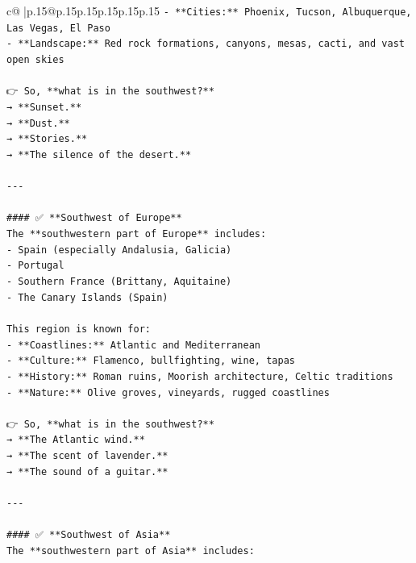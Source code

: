 \documentclass{article}
\begin{document}
{\begin{supertabular}{c@{$\;$}|p{.15\linewidth}@{}p{.15\linewidth}p{.15\linewidth}p{.15\linewidth}p{.15\linewidth}p{.15\linewidth}}
{{{\texttt{{-} **Cities:** Phoenix, Tucson, Albuquerque, Las Vegas, El Paso} \\
\texttt{{-} **Landscape:** Red rock formations, canyons, mesas, cacti, and vast open skies} \\
\\ 
\texttt{👉 So, **what is in the southwest?**  } \\
\texttt{→ **Sunset.**  } \\
\texttt{→ **Dust.**  } \\
\texttt{→ **Stories.**  } \\
\texttt{→ **The silence of the desert.**} \\
\\ 
\texttt{{-}{-}{-}} \\
\\ 
\texttt{\#\#\#\# ✅ **Southwest of Europe**  } \\
\texttt{The **southwestern part of Europe** includes:} \\
\texttt{{-} Spain (especially Andalusia, Galicia)} \\
\texttt{{-} Portugal} \\
\texttt{{-} Southern France (Brittany, Aquitaine)} \\
\texttt{{-} The Canary Islands (Spain)} \\
\\ 
\texttt{This region is known for:} \\
\texttt{{-} **Coastlines:** Atlantic and Mediterranean} \\
\texttt{{-} **Culture:** Flamenco, bullfighting, wine, tapas} \\
\texttt{{-} **History:** Roman ruins, Moorish architecture, Celtic traditions} \\
\texttt{{-} **Nature:** Olive groves, vineyards, rugged coastlines} \\
\\ 
\texttt{👉 So, **what is in the southwest?**  } \\
\texttt{→ **The Atlantic wind.**  } \\
\texttt{→ **The scent of lavender.**  } \\
\texttt{→ **The sound of a guitar.**} \\
\\ 
\texttt{{-}{-}{-}} \\
\\ 
\texttt{\#\#\#\# ✅ **Southwest of Asia**  } \\
\texttt{The **southwestern part of Asia** includes:} \\
}}}
\end{supertabular}}
\end{document}
